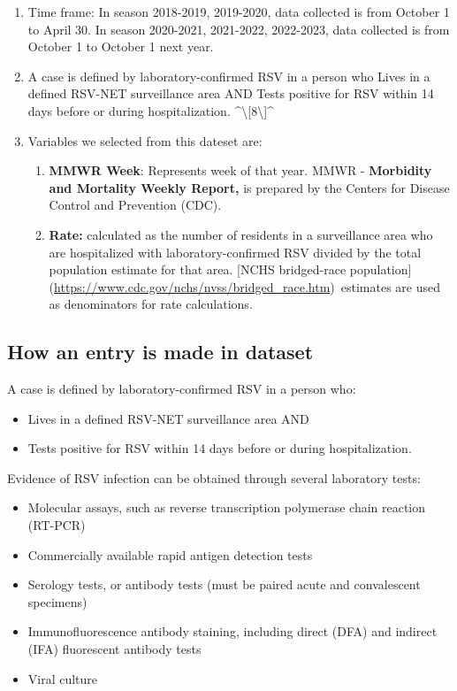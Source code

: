 \documentclass[
  letterpaper,
  DIV=11,
  numbers=noendperiod]{scrreport}
\begin{document}
\begin{enumerate}
\def\labelenumi{\arabic{enumi}.}
\item
  Time frame: In season 2018-2019, 2019-2020, data collected is from
  October 1 to April 30. In season 2020-2021, 2021-2022, 2022-2023, data
  collected is from October 1 to October 1 next year.
\item
  A case is defined by laboratory-confirmed RSV in a person who Lives in
  a defined RSV-NET surveillance area AND Tests positive for RSV within
  14 days before or during hospitalization.
  \^{}\textbackslash{[}8\textbackslash{]}\^{}
\item
  Variables we selected from this dateset are:

  \begin{enumerate}
  \def\labelenumii{\alph{enumii}.}
  \item
    \textbf{MMWR Week}: Represents week of that year. MMWR -
    \textbf{Morbidity and Mortality Weekly Report,} is prepared by the
    Centers for Disease Control and Prevention (CDC).
  \item
    \textbf{Rate:} calculated as the number of residents in a
    surveillance area who are hospitalized with laboratory-confirmed RSV
    divided by the total population estimate for that area. {[}NCHS
    bridged-race
    population{]}(\url{https://www.cdc.gov/nchs/nvss/bridged_race.htm})~estimates
    are used as denominators for rate calculations.
  \end{enumerate}
\end{enumerate}

\hypertarget{how-an-entry-is-made-in-dataset}{%
\subsection{How an entry is made in
dataset}\label{how-an-entry-is-made-in-dataset}}

A case is defined by laboratory-confirmed RSV in a person who:

\begin{itemize}
\item
  Lives in a defined RSV-NET surveillance area AND
\item
  Tests positive for RSV within 14 days before or during
  hospitalization.
\end{itemize}

Evidence of RSV infection can be obtained through several laboratory
tests:

\begin{itemize}
\item
  Molecular assays, such as reverse transcription polymerase chain
  reaction (RT-PCR)
\item
  Commercially available rapid antigen detection tests
\item
  Serology tests, or antibody tests (must be paired acute and
  convalescent specimens)
\item
  Immunofluorescence antibody staining, including direct (DFA) and
  indirect (IFA) fluorescent antibody tests
\item
  Viral culture
\end{itemize}
\end{document}
